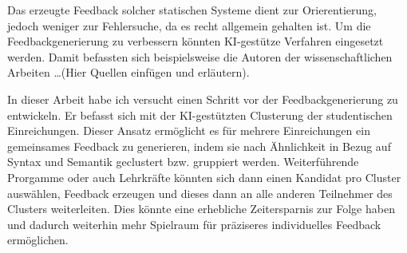 Das erzeugte Feedback solcher statischen Systeme dient zur Orierentierung, jedoch weniger zur Fehlersuche, da es recht allgemein gehalten ist. Um die Feedbackgenerierung zu verbessern könnten KI-gestütze Verfahren eingesetzt werden. Damit befassten sich beispielsweise die Autoren der wissenschaftlichen Arbeiten \dots (Hier Quellen einfügen und erläutern).

In dieser Arbeit habe ich versucht einen Schritt vor der Feedbackgenerierung zu entwickeln. Er befasst sich mit der KI-gestützten Clusterung der studentischen Einreichungen. Dieser Ansatz ermöglicht es für mehrere Einreichungen ein gemeinsames Feedback zu generieren, indem sie nach Ähnlichkeit in Bezug auf Syntax und Semantik geclustert bzw. gruppiert werden. Weiterführende Prorgamme oder auch Lehrkräfte könnten sich dann einen Kandidat pro Cluster auswählen, Feedback erzeugen und dieses dann an alle anderen Teilnehmer des Clusters weiterleiten. Dies könnte eine erhebliche Zeitersparnis zur Folge haben und dadurch weiterhin mehr Spielraum für präziseres individuelles Feedback ermöglichen.